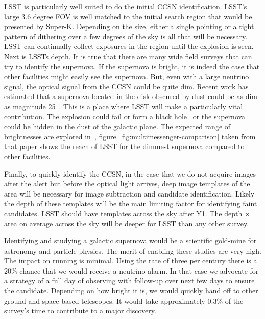 \documentclass[12pt, letterpaper]{article}
\newcommand{\superk}  {Super\nobreakdash-K\xspace}
\begin{document}
LSST is particularly well suited to do the initial CCSN
identification.  LSST's large 3.6 degree FOV is well matched to the
initial search region that would be presented by \superk.  Depending
on the size, either a single pointing or a tight pattern of dithering
over a few degrees of the sky is all that will be necessary.  LSST can
continually collect exposures in the region until the explosion is
seen. Next is LSSTs depth. It is true that there are many wide field
surveys that can try to identify the supernova.  If the supernova is
bright, it is indeed the case that other facilities might easily see
the supernova.  But, even with a large neutrino signal, the optical
signal from the CCSN could be quite dim.  Recent work has estimated
that a supernova located in the disk obscured by dust could be as dim
as magnitude 25~\cite{2016MNRAS.461.3296N}.  This is a place where
LSST will make a particularly vital contribution.  The explosion could
fail or form a black hole~\cite{2011ApJ...730...70O,
  2017hsn..book.1555O} or the supernova could be hidden in the dust of
the galactic plane.  The expected range of brightnesses are explored
in~\cite{2016MNRAS.461.3296N},
figure~\ref{fig:multimessenger-comparison} taken from that paper shows
the reach of LSST for the dimmest supernova compared to other
facilities.

Finally, to quickly identify the CCSN, in the case that we do not
acquire images after the alert but before the optical light arrives,
deep image templates of the area will be necessary for image
subtraction and candidate identification.  Likely the depth of these
templates will be the main limiting factor for identifying faint
candidates.  LSST should have templates across the sky after Y1.  The
depth $\times$ area on average across the sky will be deeper for LSST
than any other survey.

Identifying and studying a galactic supernova would be a scientific
gold-mine for astronomy and particle physics.  The merit of enabling
these studies are very high. The impact on running is minimal.  Using
the rate of three per century there is a 20\% chance that we would
receive a neutrino alarm. In that case we advocate for a strategy of a
full day of observing with follow-up over next few days to ensure the
candidate.  Depending on how bright it is, we would quickly hand off
to other ground and space-based telescopes.  It would take
approximately 0.3\% of the survey's time to contribute to a major
discovery.

\clearpage
\end{document}
